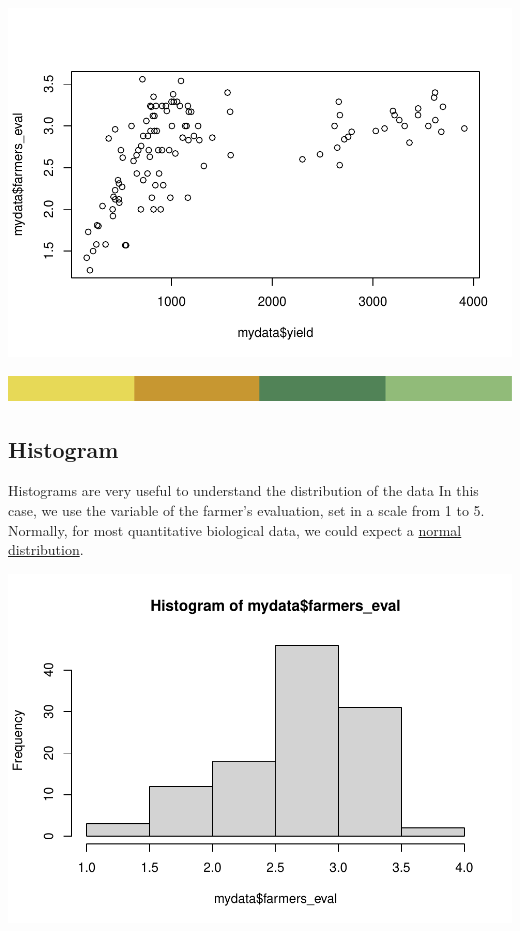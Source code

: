 \documentclass[
]{book}
\newenvironment{Shaded}{\begin{snugshade}}{\end{snugshade}}
\newcommand{\FunctionTok}[1]{\textcolor[rgb]{0.00,0.00,0.00}{#1}}
\newcommand{\NormalTok}[1]{#1}
\newcommand{\SpecialCharTok}[1]{\textcolor[rgb]{0.00,0.00,0.00}{#1}}
\begin{document}
\includegraphics{PPB-Toolkit-for-R-and-R-Studio_files/figure-latex/unnamed-chunk-57-1.pdf}

\includegraphics{rsrstrip.png}

\hypertarget{histogram}{%
\subsection{Histogram}\label{histogram}}

Histograms are very useful to understand the distribution of the data In this case, we use the variable of the farmer's evaluation, set in a scale from 1 to 5. Normally, for most quantitative biological data, we could expect a \href{https://en.wikipedia.org/wiki/Normal_distribution}{normal distribution}.

\begin{Shaded}
\end{Shaded}

\includegraphics{PPB-Toolkit-for-R-and-R-Studio_files/figure-latex/unnamed-chunk-58-1.pdf}
\end{document}
